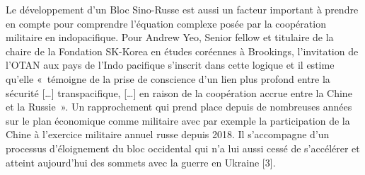 \documentclass[11pt,a4paper]{article}
\begin{document}
Le développement d'un Bloc Sino-Russe est aussi un facteur important à prendre en compte pour comprendre l'équation complexe posée par la coopération militaire en indopacifique. Pour Andrew Yeo, Senior fellow et titulaire de la chaire de la Fondation SK-Korea en études coréennes à Brookings, l'invitation de l'OTAN aux pays de l'Indo pacifique s'inscrit dans cette logique et il estime qu'elle «~témoigne de la prise de conscience d'un lien plus profond entre la sécurité {[}\ldots{]} transpacifique, {[}\ldots{]} en raison de la coopération accrue entre la Chine et la Russie~». Un rapprochement qui prend place depuis de nombreuses années sur le plan économique comme militaire avec par exemple la participation de la Chine à l'exercice militaire annuel russe depuis 2018. Il s'accompagne d'un processus d'éloignement du bloc occidental qui n'a lui aussi cessé de s'accélérer et atteint aujourd'hui des sommets avec la guerre en Ukraine {[}3{]}.
\end{document}
